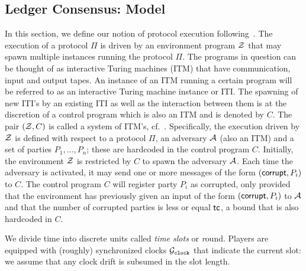 \subsection{Ledger Consensus: Model}\label{se:ledgermodel}

In this section, we define our notion of protocol execution following~\cite{EC:GarKiaLeo15,FOCS:Canetti01}.
The execution of a protocol $\Pi$ is driven by an
environment program $\mathcal{Z}$ that may spawn multiple instances running the protocol $\Pi$. The programs
in question can be thought of as interactive Turing machines (ITM) that have communication,
input and output tapes. An instance of an ITM running a certain program will be referred to as
an interactive Turing machine instance or ITI. The spawning of new ITI's by an existing ITI as
well as the interaction between them is at the discretion of a control program which is also an ITM
and is denoted by $C$. The pair $(\mathcal{Z}, C)$ is called a system of ITM's, cf.~\cite{FOCS:Canetti01}.
Specifically, the execution driven by $\mathcal{Z}$ is defined with respect to a protocol $\Pi$, an adversary $\mathcal{A}$
(also an ITM) and a set of parties $P_1,\dots,P_n$; these are hardcoded in the control program $C$.
Initially, the environment $\mathcal{Z}$ is restricted by $C$ to spawn the adversary $\mathcal{A}$. Each time the
adversary is activated, it may send one or more messages of the form $(\mathsf{corrupt}, P_i)$ to $C$. The control
program $C$ will register party $P_i$ as corrupted, only provided that the environment has previously
given an input of the form $(\mathsf{corrupt}, P_i)$ to $\mathcal{A}$ and that the number of corrupted parties is less or
equal $\mathsf{tc}$, a bound that is also hardcoded in $C$.

We divide time into discrete units called \emph{time slots} or {\emph round}. Players are equipped with (roughly)
synchronized clocks $\mathcal{G}_{\mathtt{clock}}$ that indicate the current slot: we assume that any clock drift is subsumed in the slot
length.





